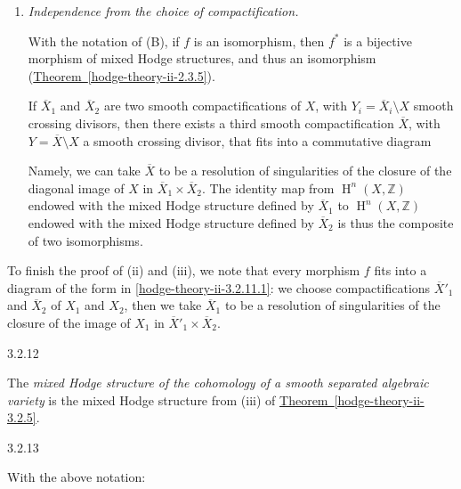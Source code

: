 \begin{enumerate}
    
 \item[(C)]
      \par{}\emph{Independence from the choice of compactification.}

      \par{}With the notation of (B), if \(f\) is an isomorphism, then \(f^*\) is a bijective morphism of mixed Hodge structures, and thus an isomorphism (\hyperref[hodge-theory-ii-2.3.5]{Theorem~\ref*{hodge-theory-ii-2.3.5}}).

      \par{}If \(\overline {X}_1\) and \(\overline {X}_2\) are two smooth compactifications of \(X\), with \(Y_i=\overline {X}_i\setminus  X\) smooth crossing divisors, then there exists a third smooth compactification \(\overline {X}\), with \(Y=\overline {X}\setminus  X\) a smooth crossing divisor, that fits into a commutative diagram
        
        

        Namely, we can take \(\overline {X}\) to be a resolution of singularities of the closure of the diagonal image of \(X\) in \(\overline {X}_1\times \overline {X}_2\).
        The identity map from \(\operatorname {H}^n(X,\mathbb {Z})\) endowed with the mixed Hodge structure defined by \(\overline {X}_1\) to \(\operatorname {H}^n(X,\mathbb {Z})\) endowed with the mixed Hodge structure defined by \(\overline {X}_2\) is thus the composite of two isomorphisms.
    

  \end{enumerate}\par{}To finish the proof of (ii) and (iii), we note that every morphism \(f\) fits into a diagram of the form in \cref{hodge-theory-ii-3.2.11.1}: we choose compactifications \(\overline {X}'_1\) and \(\overline {X}_2\) of \(X_1\) and \(X_2\), then we take \(\overline {X}_1\) to be a resolution of singularities of the closure of the image of \(X_1\) in \(\overline {X}'_1\times \overline {X}_2\).\begin{definition}{3.2.12}\label{hodge-theory-ii-3.2.12}\skipsinglepar\par{}The \emph{mixed Hodge structure of the cohomology of a smooth separated algebraic variety} is the mixed Hodge structure from (iii) of \hyperref[hodge-theory-ii-3.2.5]{Theorem~\ref*{hodge-theory-ii-3.2.5}}.\end{definition}\begin{corollary}{3.2.13}\label{hodge-theory-ii-3.2.13}\skipsinglepar\par{}With the above notation:


\end{corollary}
